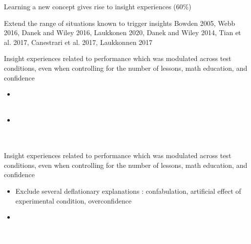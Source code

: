 \documentclass[11pt]{beamer}
\begin{document}
                    \begin{frame}

                      
                      Learning a new concept gives rise to insight experiences (60\%)


                      Extend the range of situations known to trigger insights \footnotesize{Bowden 2005, Webb 2016, Danek and Wiley 2016, Laukkonen 2020, Danek and Wiley 2014, Tian et al. 2017, Canestrari et al. 2017, Laukkonnen 2017}




                    \end{frame}



                                        \begin{frame}

                      Insight experiences related to performance which was modulated across test conditions,
                      even when controlling for the number of lessons, math education, and confidence

                      \begin{itemize}

                       \item{ \textcolor{white}{Exclude several deflationary explanations : confabulation, artificial effect of experimental condition, overconfidence}}

                     \item{ \textcolor{white}{Reflect the functioning of learning processes as a term of a specific state, and the probability to reach this state increased when participants received more lessons to study}}
                       \end{itemize}

                    \end{frame}

                                        \begin{frame}

                      Insight experiences related to performance which was modulated across test conditions,
                      even when controlling for the number of lessons, math education, and confidence

                      \begin{itemize}

                       \item{ Exclude several deflationary explanations : confabulation, artificial effect of experimental condition, overconfidence}

                     \item{ \textcolor{white}{Reflect the functioning of learning processes as a term of a specific state, and the probability to reach this state increased when participants received more lessons to study}}
                       \end{itemize}

                    \end{frame}
\end{document}
